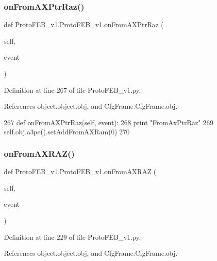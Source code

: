 \subsubsection{\texorpdfstring{on\+From\+A\+X\+Ptr\+Raz()}{onFromAXPtrRaz()}}
{\footnotesize\ttfamily def Proto\+F\+E\+B\+\_\+v1.\+Proto\+F\+E\+B\+\_\+v1.\+on\+From\+A\+X\+Ptr\+Raz (\begin{DoxyParamCaption}\item[{}]{self,  }\item[{}]{event }\end{DoxyParamCaption})}



Definition at line 267 of file Proto\+F\+E\+B\+\_\+v1.\+py.



References object.\+object.\+obj, and Cfg\+Frame.\+Cfg\+Frame.\+obj.


\begin{DoxyCode}
267     \textcolor{keyword}{def }onFromAXPtrRaz(self, event):
268         \textcolor{keywordflow}{print} \textcolor{stringliteral}{"FromAxPtrRaz"}
269         self.obj.a3pe().setAddFromAXRam(0)
270 
\end{DoxyCode}
\mbox{\label{classProtoFEB__v1_1_1ProtoFEB__v1_a4829ef01438ae9be1106a715ba8feffd}} 
\subsubsection{\texorpdfstring{on\+From\+A\+X\+R\+A\+Z()}{onFromAXRAZ()}}
{\footnotesize\ttfamily def Proto\+F\+E\+B\+\_\+v1.\+Proto\+F\+E\+B\+\_\+v1.\+on\+From\+A\+X\+R\+AZ (\begin{DoxyParamCaption}\item[{}]{self,  }\item[{}]{event }\end{DoxyParamCaption})}



Definition at line 229 of file Proto\+F\+E\+B\+\_\+v1.\+py.



References object.\+object.\+obj, and Cfg\+Frame.\+Cfg\+Frame.\+obj.


